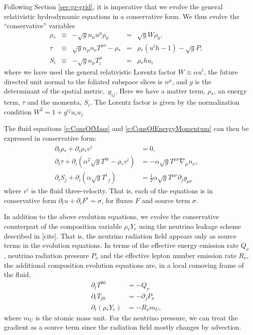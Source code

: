 Following Section \ref{sec:gr-grid}, it is imperative that we evolve the general relativistic hydrodynamic equations in a conservative form.  We thus evolve the ``conservative'' variables
\begin{align}
\label{e:RhoStar}
\rho_*	&\equiv& -\sqrt{g} n_\mu u^\mu \rho_0 
		&=& \sqrt{g} W \rho_0, \\
\label{e:Tau}
\tau 	&\equiv& \sqrt{g} n_\mu n_\nu T^{\mu\nu} - \rho_* 
		&=& \rho_* \left(u^t h - 1\right) - \sqrt{g} P, \\
\label{e:Sflux}
S_i  	&\equiv& -\sqrt{g} n_\mu T^\mu_i 
		&=& \rho_* h u_i
\end{align}
where we have used the general relativistic Lorentz factor $W \equiv \alpha u^t$, the future directed unit normal to the foliated subspace slices is $n^\mu$, and $g$ is the determinant of the spatial \mbox{metric, $g_{ij}$}.  Here we have a matter term, $\rho_*$, an energy term, $\tau$ and the momenta, $S_i$.  The Lorentz factor is given by the normalization condition $W^2 = 1 + g^{ij} u_i u_j$

The fluid equations \ref{e:ConsOfMass} and \ref{e:ConsOfEnergyMomentum} can then be expressed in conservative form:
\begin{align}
\label{e:ADMConsOfMass}
\partial_t \rho_* + \partial_i \rho_* v^i 
	&= 0, \\
\label{e:ADMConsOfEnergy}
\partial_t \tau + \partial_i \left(\alpha^2 \sqrt{g} T^{0 i} - \rho_*v^i\right) 
	&= -\alpha \sqrt{g} T^{\mu \nu} \nabla_\mu n_\nu, \\
\label{e:ADMConsofMomentum}
\partial_t S_j + \partial_i\left(\alpha \sqrt{g}T^i_{\,\,\,j}\right) 
	&= \frac{1}{2} \alpha \sqrt{g} T^{\mu \nu} \partial_j g_{\mu \nu}
\end{align}
where $v^i$ is the fluid three-velocity.  That is, each of the equations is in conservative form $\partial_t u  + \partial_i F^i = \sigma$, for  fluxes $F$ and  source term $\sigma$.  

In addition to the above evolution equations, we evolve the conservative counterpart of the composition variable $\rho_* Y_e$ using the neutrino leakage scheme described in [cite].  That is, the neutrino radiation field appears only as source terms in the evolution equations.  In terms of the effective energy emission rate $Q_\nu$, neutrino radiation pressure $P_\nu$ and the effective lepton number emission rate $R_\nu$, the additional composition evolution equations are, in a local comoving frame of the fluid, 
\begin{align}
\partial_t T^{00} &= -Q_\nu \\
\partial_t T_{j0} &= - \partial_j P_\nu \\
\partial_t (\rho_* Y_e) &= -R_\nu m_U ,
\end{align}
where $m_U$ is the atomic mass unit.  For the neutrino pressure, we can treat the gradient as a source term since the radiation field mostly changes by advection.

